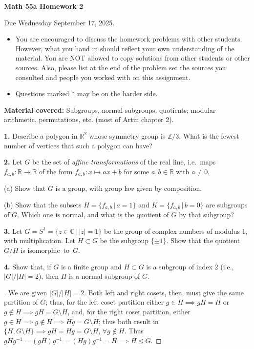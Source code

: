 \documentclass[11pt,letterpaper]{article}
\def\R{\mathbb{R}}
\def\Z{\mathbb{Z}}
\def\C{\mathbb{C}}
\begin{document}
\begin{center}
{\bf \Large Math 55a Homework 2}\medskip

Due Wednesday September 17, 2025.
\end{center}

\begin{itemize}
\item You are encouraged to discuss the homework problems with 
other students. However, what you hand in should reflect your 
own understanding of the material. You are NOT allowed to copy solutions 
from other students or other sources. Also, please list at the end of the
problem set the sources you consulted and people you worked with on 
this assignment.
\item Questions marked * may be on the harder side.
\end{itemize}

{\bf Material covered:} Subgroups, normal subgroups, quotients; modular arithmetic,
permutations, etc. (most of Artin chapter 2).
\bigskip

{\bf 1.} Describe a polygon in $\R^2$ whose symmetry group is $\Z/3$. What
is the fewest number of vertices that such a polygon can have?
\medskip

{\bf 2.} Let $G$ be the set of {\em affine transformations} of the real
line, i.e.\ maps $f_{a,b}:\R\to \R$ of the form $f_{a,b}:x\mapsto ax+b$ for
some $a,b\in \R$ with $a\neq 0$.

(a) Show that $G$ is a group, with group law given by composition.

(b) Show that the subsets $H=\{f_{a,b}\,|\,a=1\}$ and $K=\{f_{a,b}\,|\,b=0\}$
are subgroups of $G$. Which one is normal, and what is the quotient of
$G$ by that subgroup?
\medskip

{\bf 3.} Let $G=S^1=\{z\in \C\,|\,|z|=1\}$ be the group of complex numbers
of modulus 1, with multiplication. Let $H\subset G$ be the subgroup $\{\pm 1\}$.
Show that the quotient $G/H$ is isomorphic~to~$G$.\medskip

{\bf 4.} Show that, if $G$ is a finite group and $H\subset G$ is a subgroup
of index 2 (i.e., $|G|/|H|=2$), then $H$ is a normal subgroup of $G$.
\medskip

\begin{proof}[]
  We are given \( |G|/|H|=2 \). Both left and right cosets, then, must give the same partition of \( G \); thus, for the left coset partition either \( g \in  H\implies gH=H \) or \( g \not\in H \implies gH=G \setminus H \), and, for the right coset partition, either \( g \in  H \implies g \not\in H \implies Hg= G \setminus H \); thus both result in \( \{H,G \setminus H\} \implies gH=Hg=G\setminus H , \, \forall  g \not \in  H\). Thus \( gHg^{-1}=(gH)g^{-1}=(Hg)g^{-1}=H \implies H \unlhd G \).
\end{proof}
\end{document}
